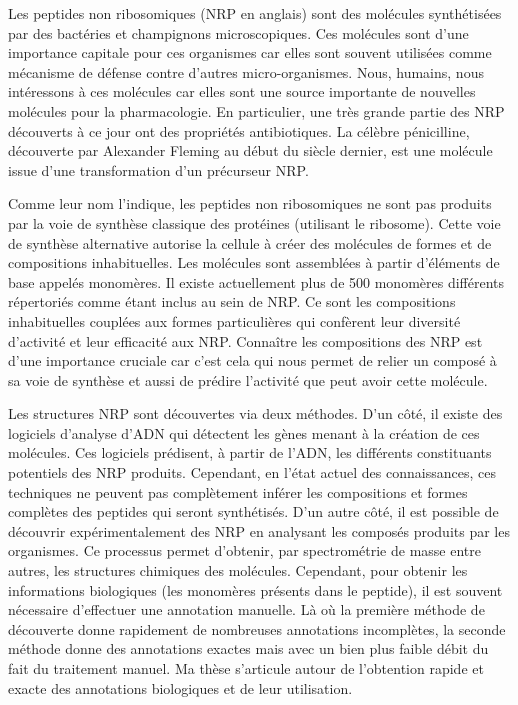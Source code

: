 Les peptides non ribosomiques (NRP en anglais) sont des molécules synthétisées par des bactéries et champignons microscopiques.
Ces molécules sont d'une importance capitale pour ces organismes car elles sont souvent utilisées comme mécanisme de défense contre d'autres micro-organismes.
Nous, humains, nous intéressons à ces molécules car elles sont une source importante de nouvelles molécules pour la pharmacologie.
En particulier, une très grande partie des NRP découverts à ce jour ont des propriétés antibiotiques.
La célèbre pénicilline, découverte par Alexander Fleming au début du siècle dernier, est une molécule issue d'une transformation d'un précurseur NRP.

Comme leur nom l'indique, les peptides non ribosomiques ne sont pas produits par la voie de synthèse classique des protéines (utilisant le ribosome).
Cette voie de synthèse alternative autorise la cellule à créer des molécules de formes et de compositions inhabituelles.
Les molécules sont assemblées à partir d'éléments de base appelés monomères.
Il existe actuellement plus de 500 monomères différents répertoriés comme étant inclus au sein de NRP.
Ce sont les compositions inhabituelles couplées aux formes particulières qui confèrent leur diversité d'activité et leur efficacité aux NRP.
Connaître les compositions des NRP est d'une importance cruciale car c'est cela qui nous permet de relier un composé à sa voie de synthèse et aussi de prédire l'activité que peut avoir cette molécule.

Les structures NRP sont découvertes via deux méthodes.
D'un côté, il existe des logiciels d'analyse d'ADN qui détectent les gènes menant à la création de ces molécules.
Ces logiciels prédisent, à partir de l'ADN, les différents constituants potentiels des NRP produits.
Cependant, en l'état actuel des connaissances, ces techniques ne peuvent pas complètement inférer les compositions et formes complètes des peptides qui seront synthétisés.
D'un autre côté, il est possible de découvrir expérimentalement des NRP en analysant les composés produits par les organismes.
Ce processus permet d'obtenir, par spectrométrie de masse entre autres, les structures chimiques des molécules.
Cependant, pour obtenir les informations biologiques (les monomères présents dans le peptide), il est souvent nécessaire d'effectuer une annotation manuelle.
Là où la première méthode de découverte donne rapidement de nombreuses annotations incomplètes, la seconde méthode donne des annotations exactes mais avec un bien plus faible débit du fait du traitement manuel.
Ma thèse s'articule autour de l'obtention rapide et exacte des annotations biologiques et de leur utilisation.

